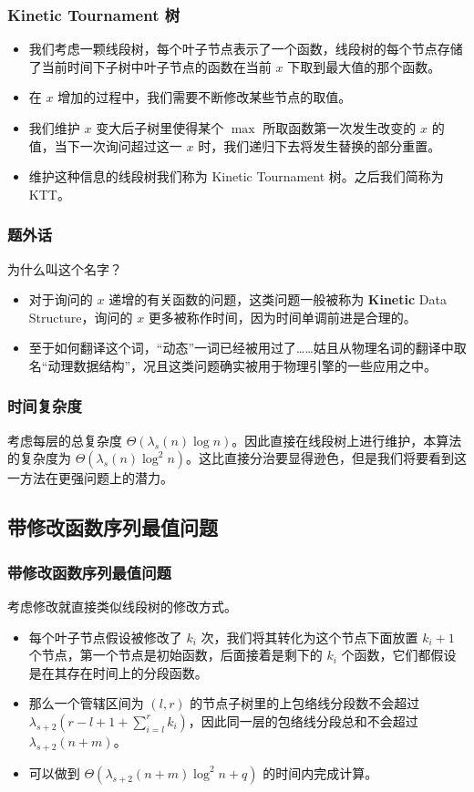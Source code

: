 \documentclass[mathserif]{ctexbeamer}
\begin{document}
\frame
{
\frametitle{Kinetic Tournament 树}

\begin{itemize}
\item<1->我们考虑一颗线段树，每个叶子节点表示了一个函数，线段树的每个节点存储了当前时间下子树中叶子节点的函数在当前 $x$ 下取到最大值的那个函数。

\item<2->在 $x$ 增加的过程中，我们需要不断修改某些节点的取值。

\item<3->我们维护 $x$ 变大后子树里使得某个 $\max$ 所取函数第一次发生改变的 $x$ 的值，当下一次询问超过这一 $x$ 时，我们递归下去将发生替换的部分重置。

\item<4->维护这种信息的线段树我们称为 Kinetic Tournament 树。之后我们简称为 KTT。
\end{itemize}
}

\frame
{
  \frametitle{题外话}
  
  为什么叫这个名字？
  
  \begin{itemize}
  \item<1->对于询问的 $x$ 递增的有关函数的问题，这类问题一般被称为 \textbf{Kinetic} Data Structure，询问的 $x$ 更多被称作时间，因为时间单调前进是合理的。
  \item<2->至于如何翻译这个词，“动态”一词已经被用过了……姑且从物理名词的翻译中取名“动理数据结构”，况且这类问题确实被用于物理引擎的一些应用之中。
  \end{itemize}
}

\frame
{
  \frametitle{时间复杂度}
  
  考虑每层的总复杂度 $\Theta(\lambda_s(n)\log n)$。因此直接在线段树上进行维护，本算法的复杂度为 $\Theta(\lambda_s(n)\log^2 n)$。这比直接分治要显得逊色，但是我们将要看到这一方法在更强问题上的潜力。
}

\subsection{带修改函数序列最值问题}

\frame
{
  \frametitle{带修改函数序列最值问题}
  
  考虑修改就直接类似线段树的修改方式。
  
  \begin{itemize}
  \item<1->每个叶子节点假设被修改了 $k_i$ 次，我们将其转化为这个节点下面放置 $k_i + 1$ 个节点，第一个节点是初始函数，后面接着是剩下的 $k_i$ 个函数，它们都假设是在其存在时间上的分段函数。
  
  \item<2->那么一个管辖区间为 $(l, r)$ 的节点子树里的上包络线分段数不会超过 $\lambda_{s + 2}(r - l + 1 + \sum_{i=l}^r k_i)$，因此同一层的包络线分段总和不会超过 $\lambda_{s + 2}(n + m)$。
  
  \item<3->可以做到 $\Theta(\lambda_{s + 2}(n + m)\log^2 n + q)$ 的时间内完成计算。
  
  \end{itemize}

}
\end{document}
